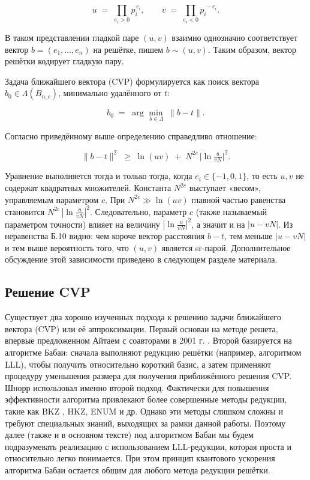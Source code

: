 \begin{equation}
  u \;=\; \prod_{e_{i}>0} p_{i}^{\,e_{i}},
  \qquad
  v \;=\; \prod_{e_{i}<0} p_{i}^{\,-e_{i}}.
\end{equation}

В таком представлении гладкой паре $(u,v)$ взаимно однозначно соответствует
вектор $b=(e_{1},\dots,e_{n})$ на решётке, пишем $b\sim(u,v)$. Таким образом,
вектор решётки кодирует гладкую пару.

Задача ближайшего вектора (CVP) формулируется как поиск вектора
$b_{0}\in\Lambda(B_{n,c})$, минимально удалённого от $t$:

\begin{equation}
    b_{0} \;=\; \arg\min_{\,b\in\Lambda}\;\lVert b - t\rVert.
\end{equation}

Согласно приведённому выше определению справедливо отношение:

\begin{equation}
  \lVert b - t\rVert^{2}
  \;\ge\;
  \ln(uv) \;+\; N^{2c}\,\bigl|\ln\tfrac{u}{vN}\bigr|^{2}.
\end{equation}

Уравнение выполняется тогда и только тогда, когда $e_{i}\in\{-1,0,1\}$, то есть
$u,v$ не содержат квадратных множителей. Константа $N^{2c}$ выступает «весом»,
управляемым параметром $c$. При $N^{2c}\gg\ln(uv)$ главной частью равенства
становится $N^{2c}\,|\ln\frac{u}{vN}|^{2}$. Следовательно, параметр $c$ (также
называемый параметром точности) влияет на величину $|\ln\frac{u}{vN}|^{2}$, а
значит и на $|u-vN|$. Из неравенства Б.10 видно: чем короче вектор расстояния
$b-t$, тем меньше $|u-vN|$ и тем выше вероятность того, что $(u,v)$ является
sr‑парой. Дополнительное обсуждение этой зависимости приведено в следующем
разделе материала.

\subsection*{Решение CVP}

Существует два хорошо изученных подхода к решению задачи ближайшего вектора
(CVP) или её аппроксимации. Первый основан на методе решета, впервые
предложенном Айтаем с соавторами в 2001 г. \cite{cite_36}. Второй базируется на
алгоритме Бабаи: сначала выполняют редукцию решётки (например, алгоритмом LLL),
чтобы получить относительно короткий базис, а затем применяют процедуру
уменьшения размера для получения приближённого решения CVP. Шнорр использовал
именно второй подход. Фактически для повышения эффективности алгоритма
привлекают более совершенные методы редукции, такие как BKZ \cite{cite_37},
HKZ, ENUM \cite{cite_37,cite_38,cite_39,cite_40} и др. Однако эти методы
слишком сложны и требуют специальных знаний, выходящих за рамки данной работы.
Поэтому далее (также и в основном тексте) под алгоритмом Бабаи мы будем
подразумевать реализацию с использованием LLL‑редукции, которая проста и
относительно легко понимается. При этом принцип квантового ускорения алгоритма
Бабаи остается общим для любого метода редукции решётки.
